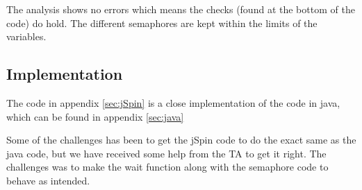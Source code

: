 The analysis shows no errors which means the checks (found at the bottom of the code) do hold. The different semaphores are kept within the limits of the variables. 

\subsection{Implementation}
The code in appendix \ref{sec:jSpin} is a close implementation of the code in java, which can be found in appendix \ref{sec:java}

Some of the challenges has been to get the jSpin code to do the exact same as the java code, but we have received some help from the TA to get it right. The challenges was to make the wait function along with the semaphore code to behave as intended.
